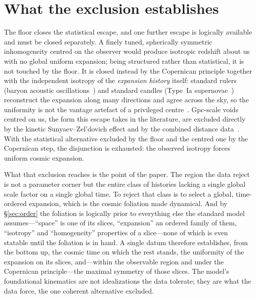 \documentclass[11pt,a4paper]{article}
\begin{document}
\section{What the exclusion establishes}\label{sec:establishes}

The floor closes the statistical escape, and one further escape is logically available and must be closed separately. A finely tuned, spherically symmetric inhomogeneity centred on the observer would produce isotropic redshift about us with no global uniform expansion; being structured rather than statistical, it is not touched by the floor. It is closed instead by the Copernican principle together with the independent isotropy of the \emph{expansion history} itself: standard rulers (baryon acoustic oscillations~\cite{Eisenstein2005}) and standard candles (Type~Ia supernovae~\cite{Riess1998, Perlmutter1999}) reconstruct the expansion along many directions and agree across the sky, so the uniformity is not the vantage artefact of a privileged centre~\cite{Barrett2000, Clarkson2010, Maartens2011}. Gpc-scale voids centred on us, the form this escape takes in the literature, are excluded directly by the kinetic Sunyaev--Zel'dovich effect and by the combined distance data~\cite{ZhangStebbins2011, Moss2011}. With the statistical alternative excluded by the floor and the centred one by the Copernican step, the disjunction is exhausted: the observed isotropy forces uniform cosmic expansion.

What that exclusion reaches is the point of the paper. The region the data reject is not a parameter corner but the entire class of histories lacking a single global scale factor on a single global time. To reject that class is to select a global, time-ordered expansion, which is the cosmic foliation made dynamical. And by \S\ref{sec:order} the foliation is logically prior to everything else the standard model assumes---``space'' is one of its slices, ``expansion'' an ordered family of them, ``isotropy'' and ``homogeneity'' properties of a slice---none of which is even statable until the foliation is in hand. A single datum therefore establishes, from the bottom up, the cosmic time on which the rest stands, the uniformity of the expansion on its slices, and---within the observable region and under the Copernican principle---the maximal symmetry of those slices. The model's foundational kinematics are not idealizations the data tolerate; they are what the data force, the one coherent alternative excluded.
\end{document}
